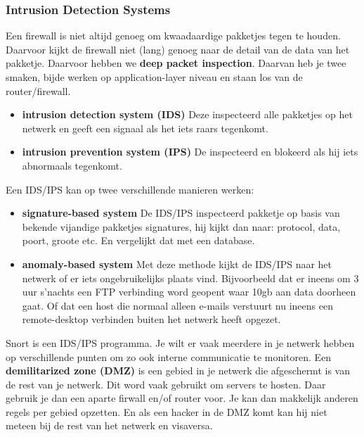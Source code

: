 \subsubsection{Intrusion Detection Systems}
Een firewall is niet altijd genoeg om kwaadaardige pakketjes tegen te houden. Daarvoor kijkt de firewall niet (lang)
genoeg naar de detail van de data van het pakketje. Daarvoor hebben we \textbf{deep packet inspection}. Daarvan heb
je twee smaken, bijde werken op application-layer niveau en staan los van de router/firewall.
\begin{itemize}
    \item \textbf{intrusion detection system (IDS)} Deze inspecteerd alle pakketjes op het netwerk en geeft een
    signaal als het iets raars tegenkomt.
    \item \textbf{intrusion prevention system (IPS)} De inspecteerd en blokeerd als hij iets abnormaals tegenkomt.
\end{itemize}
Een IDS/IPS kan op twee verschillende manieren werken:
\begin{itemize}
    \item \textbf{signature-based system} De IDS/IPS inspecteerd pakketje op basis van bekende vijandige pakketjes
    signatures, hij kijkt dan naar: protocol, data, poort, groote etc. En vergelijkt dat met een database.
    \item \textbf{anomaly-based system} Met deze methode kijkt de IDS/IPS naar het netwerk of er iets ongebruikelijks
    plaats vind. Bijvoorbeeld dat er ineens om 3 uur s'nachts een FTP verbinding word geopent waar 10gb aan data
    doorheen gaat. Of dat een host die normaal alleen e-mails verstuurt nu ineens een remote-desktop verbinden buiten
    het netwerk heeft opgezet.
\end{itemize}
Snort is een IDS/IPS programma. Je wilt er vaak meerdere in je netwerk hebben op verschillende punten om zo ook
interne communicatie te monitoren.
\newline
Een \textbf{demilitarized zone (DMZ)} is een gebied in je netwerk die afgeschermt is van de rest van je netwerk. Dit
word vaak gebruikt om servers te hosten. Daar gebruik je dan een aparte firwall en/of router voor. Je kan dan
makkelijk anderen regels per gebied opzetten. En als een hacker in de DMZ komt kan hij niet meteen bij de rest van
het netwerk en visaversa.
